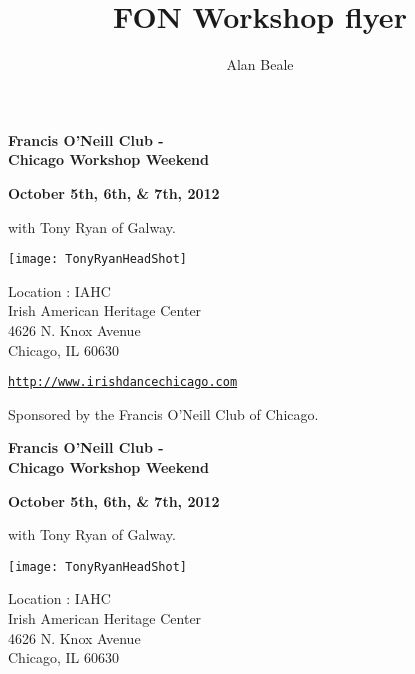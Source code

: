 \documentclass[10pt,letterpaper,notumble]{leaflet}
\title{FON Workshop flyer}
\author{Alan Beale}
\date{}
\begin{document}

\pagebreak

\pagebreak

\pagebreak
\begin{center}
{\Large\textbf{Francis O'Neill Club - \\ Chicago Workshop Weekend}}\\ 
\end{center}

\begin{center}
\textbf{October 5th, 6th, \&  7th, 2012} 
\end{center}

\vspace*{0.25em}
with Tony Ryan of Galway.

\vspace*{0.45em}
\begin{center}
\texttt{[image: TonyRyanHeadShot]}
\end{center}

\vspace*{2.5em}
Location : IAHC\\
Irish American Heritage Center\\
4626 N. Knox Avenue\\
Chicago, IL  60630 

\vspace*{2em}
\href{http://www.irishdancechicago.com}{\tt http://www.irishdancechicago.com} 

{\small Sponsored by the Francis O'Neill Club of Chicago.}

\pagebreak
\begin{center}
{\Large\textbf{Francis O'Neill Club - \\ Chicago Workshop Weekend}}\\ 
\end{center}

\begin{center}
\textbf{October 5th, 6th, \&  7th, 2012} 
\end{center}

\vspace*{0.25em}
with Tony Ryan of Galway.

\vspace*{0.45em}
\begin{center}
\texttt{[image: TonyRyanHeadShot]}
\end{center}

\vspace*{2.5em}
Location : IAHC\\
Irish American Heritage Center\\
4626 N. Knox Avenue\\
Chicago, IL  60630 
\end{document}

